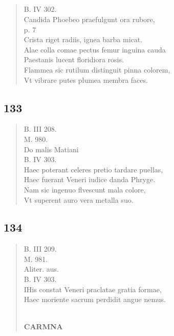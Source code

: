 \documentclass[11pt, a4paper]{report}
\begin{document}
            \subsection*{}
      \begin{verse}
      B. IV 302. \\ Candida Phoebeo praefulgunt ora rubore, \\ p. 7 \\ Crista riget radiis, ignea barba micat. \\ Alae colla comae pectus femur inguina cauda \\ Paestanis lucent floridiora rosis. \\ Flammea sic rutilum distinguit pinna colorem, \\ Vt vibrare putes plumea membra faces. \\ 
      \end{verse}
  
            \subsection*{133}
      \begin{verse}
      B. III 208. \\ M. 980. \\ Do malis Matiani \\ B. IV 303. \\ Haec poterant celeres pretio tardare puellas, \\ Haec fuerant Veneri iudice danda Phryge. \\ Nam sic ingenuo flvescunt mala colore, \\ Vt superent auro vera metalla suo. \\ 
      \end{verse}
  
            \subsection*{134}
      \begin{verse}
      B. III 209. \\ M. 981. \\ Aliter. aus. \\ B. IV 303. \\ IHis constat Veneri praclatae gratia formae, \\ Haec moriente sacrum perdidit angue nemus. \\ 
        ﻿\pagebreak 
    \begin{center} \textbf{CARMNA} \end{center} \marginpar{[140]} 
      \end{verse}
  
\end{document}
